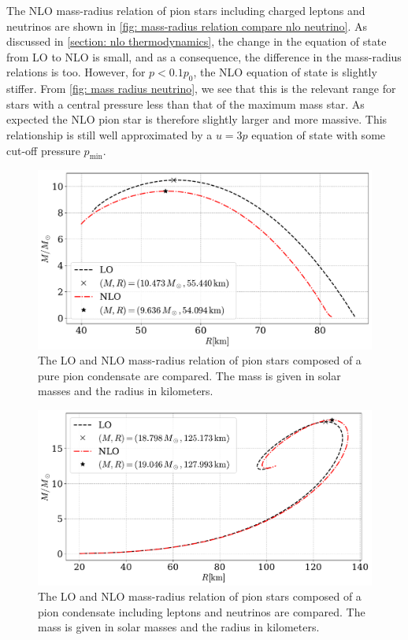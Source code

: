 The NLO mass-radius relation of pion stars including charged leptons and neutrinos are shown in \autoref{fig: mass-radius relation compare nlo neutrino}.
As discussed in \autoref{section: nlo thermodynamics}, the change in the equation of state from LO to NLO is small, and as a consequence, the difference in the mass-radius relations is too.
However, for $p < 0.1 p_0$, the NLO equation of state is slightly stiffer.
From \autoref{fig: mass radius neutrino}, we see that this is the relevant range for stars with a central pressure less than that of the maximum mass star.
As expected the NLO pion star is therefore slightly larger and more massive.
This relationship is still well approximated by a $u = 3p$ equation of state with some cut-off pressure $p_\text{min}$.

\begin{figure}[H]
    \centering
    \includegraphics[width=.75\textwidth]{../scripts/figurer/pion_star/mass_compare_order.pdf}
    \caption{
        The LO and NLO mass-radius relation of pion stars composed of a pure pion condensate are compared.
        The mass is given in solar masses and the radius in kilometers.}
    \label{fig: mass-radius relation compare nlo}
\end{figure}

\begin{figure}[H]
    \centering
    \includegraphics[width=.75\textwidth]{../scripts/figurer/pion_star/mass_compare_order_neutrino.pdf}
    \caption{
        The LO and NLO mass-radius relation of pion stars composed of a pion condensate including leptons and neutrinos are compared.
        The mass is given in solar masses and the radius in kilometers.}
    \label{fig: mass-radius relation compare nlo neutrino}
\end{figure}




